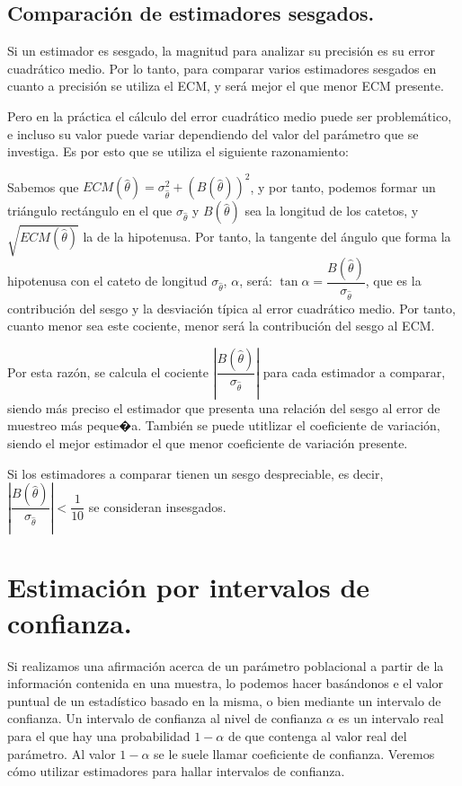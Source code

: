 \subsection{Comparaci\'on de estimadores sesgados.}

Si un estimador es sesgado, la magnitud para analizar su precisi\'on
es su error cuadr\'atico medio. Por lo tanto, para comparar varios estimadores
sesgados en cuanto a precisi\'on se utiliza el ECM, y ser\'a mejor el
que menor ECM presente.

Pero en la pr\'actica el c\'alculo del error cuadr\'atico medio puede ser
problem\'atico, e incluso su valor puede variar dependiendo del valor
del par\'ametro que se investiga. Es por esto que se utiliza el siguiente
razonamiento:

Sabemos que $ECM\left(\hat{\theta}\right)=\sigma_{\hat{\theta}}^{2}+\left(B\left(\hat{\theta}\right)\right)^{2}$,
y por tanto, podemos formar un tri\'angulo rect\'angulo en el que $\sigma_{\hat{\theta}}$
y $B\left(\hat{\theta}\right)$ sea la longitud de los catetos, y
$\sqrt{ECM\left(\hat{\theta}\right)}$ la de la hipotenusa. Por tanto,
la tangente del \'angulo que forma la hipotenusa con el cateto de longitud
$\sigma_{\hat{\theta}}$, $\alpha$, ser\'a: $\tan\alpha=\dfrac{B\left(\hat{\theta}\right)}{\sigma_{\hat{\theta}}}$,
que es la contribuci\'on del sesgo y la desviaci\'on t\'ipica al error cuadr\'atico
medio. Por tanto, cuanto menor sea este cociente, menor ser\'a la contribuci\'on
del sesgo al ECM.

Por esta raz\'on, se calcula el cociente $\left|\dfrac{B\left(\hat{\theta}\right)}{\sigma_{\hat{\theta}}}\right|$
para cada estimador a comparar, siendo m\'as preciso el estimador que
presenta una relaci\'on del sesgo al error de muestreo m\'as peque�a.
Tambi\'en se puede utitlizar el coeficiente de variaci\'on, siendo el
mejor estimador el que menor coeficiente de variaci\'on presente.

Si los estimadores a comparar tienen un sesgo despreciable, es decir,$\left|\dfrac{B\left(\hat{\theta}\right)}{\sigma_{\hat{\theta}}}\right|<\dfrac{1}{10}$
se consideran insesgados.


\section{Estimaci\'on por intervalos de confianza.}

Si realizamos una afirmaci\'on acerca de un par\'ametro poblacional a
partir de la informaci\'on contenida en una muestra, lo podemos hacer
bas\'andonos e el valor puntual de un estad\'istico basado en la misma,
o bien mediante un intervalo de confianza. Un intervalo de confianza
al nivel de confianza $\alpha$ es un intervalo real para el que hay
una probabilidad $1-\alpha$ de que contenga al valor real del par\'ametro.
Al valor $1-\alpha$ se le suele llamar coeficiente de confianza.
Veremos c\'omo utilizar estimadores para hallar intervalos de confianza.



